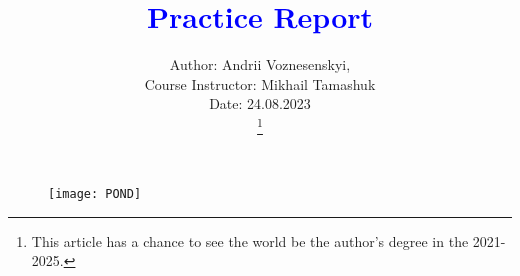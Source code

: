\documentclass[journal]{IEEEtran}
\begin{document}
\title{\textcolor{blue}{Practice Report}}      

\author{Author: Andrii Voznesenskyi,\\
		Course Instructor: Mikhail Tamashuk\\

        Date: 24.08.2023\\

\thanks{This article has a chance to see the world be the author's degree in the 2021-2025.}} 



\maketitle

\begin{figure}[h!] \centering
\texttt{[image: POND]}
\end{figure}  







\ifCLASSOPTIONcaptionsoff
  \newpage
\fi


\end{document}
